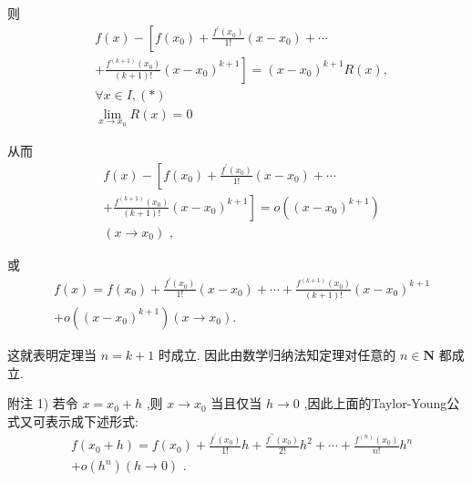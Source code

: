 则
\begin{align*}
	&f\left( x\right)  - \left\lbrack  {f\left( {x}_{0}\right)  + \frac{{f}^{\prime }\left( {x}_{0}\right) }{1!}\left( {x - {x}_{0}}\right)  + \cdots }\right.\\
	&\left. {+\frac{{f}^{\left( k + 1\right) }\left( {x}_{0}\right) }{\left( {k + 1}\right) !}{\left( x - {x}_{0}\right) }^{k + 1}}\right\rbrack   = {\left( x - {x}_{0}\right) }^{k + 1}R\left( x\right) ,\\
	&\forall x \in  I,\left( *\right)\\
	&\mathop{\lim }\limits_{{x \rightarrow  {x}_{0}}}R\left( x\right)  = 0
\end{align*}

从而
\begin{align*}
	&f\left( x\right)  - \left\lbrack  {f\left( {x}_{0}\right)  + \frac{{f}^{\prime }\left( {x}_{0}\right) }{1!}\left( {x - {x}_{0}}\right)  + \cdots }\right.\\
	&\left. {+\frac{{f}^{\left( k + 1\right) }\left( {x}_{0}\right) }{\left( {k + 1}\right) !}{\left( x - {x}_{0}\right) }^{k + 1}}\right\rbrack   = o\left( {\left( x - {x}_{0}\right) }^{k + 1}\right)\\
	&\left( {x \rightarrow  {x}_{0}}\right) \text{ , }
\end{align*}

或
\begin{align*}
	&f\left( x\right)  = f\left( {x}_{0}\right)  + \frac{{f}^{\prime }\left( {x}_{0}\right) }{1!}\left( {x - {x}_{0}}\right)  + \cdots  + \frac{{f}^{\left( k + 1\right) }\left( {x}_{0}\right) }{\left( {k + 1}\right) !}{\left( x - {x}_{0}\right) }^{k + 1}\\
	&+ o\left( {\left( x - {x}_{0}\right) }^{k + 1}\right) \left( {x \rightarrow  {x}_{0}}\right) .
\end{align*}

这就表明定理当 $n = k + 1$ 时成立. 因此由数学归纳法知定理对任意的 $n \in  \mathbf{N}$ 都成立.

附注 1) 若令 $x = {x}_{0} + h$ ,则 $x \rightarrow  {x}_{0}$ 当且仅当 $h \rightarrow  0$ ,因此上面的Taylor-Young公式又可表示成下述形式:
\begin{align*}
	&f\left( {{x}_{0} + h}\right)  = f\left( {x}_{0}\right)  + \frac{{f}^{\prime }\left( {x}_{0}\right) }{1!}h + \frac{{f}^{\prime \prime }\left( {x}_{0}\right) }{2!}{h}^{2} + \cdots  + \frac{{f}^{\left( n\right) }\left( {x}_{0}\right) }{n!}{h}^{n}\\
	&+ o\left( {h}^{n}\right) \left( {h \rightarrow  0}\right) \text{ . }
\end{align*}

